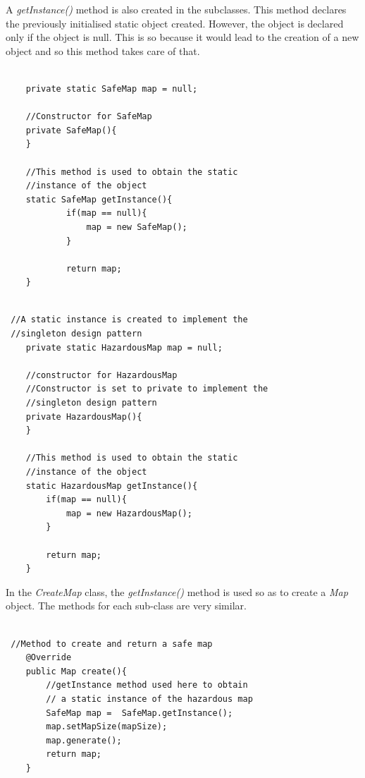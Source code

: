 \documentclass[a4paper,12pt]{extarticle}
\begin{document}
\noindent A \textit{getInstance()} method is also created in the subclasses. This method declares the previously initialised static object created. However, the object is declared only if the object is null. This is so because it would lead to the creation of a new object and so this method takes care of that.\\

\newpage
\begin{lstlisting}

    private static SafeMap map = null;

    //Constructor for SafeMap
    private SafeMap(){
    }

    //This method is used to obtain the static 
    //instance of the object
    static SafeMap getInstance(){
            if(map == null){
                map = new SafeMap();
            }

            return map;
    }
    
\end{lstlisting}
\vspace{4mm}


\begin{lstlisting}
 //A static instance is created to implement the 
 //singleton design pattern
    private static HazardousMap map = null;

    //constructor for HazardousMap
    //Constructor is set to private to implement the 
    //singleton design pattern
    private HazardousMap(){
    }

    //This method is used to obtain the static 
    //instance of the object
    static HazardousMap getInstance(){
        if(map == null){
            map = new HazardousMap();
        }

        return map;
    }

\end{lstlisting}
\vspace{4mm}

\noindent In the \textit{CreateMap} class, the \textit{getInstance()} method is used so as to create a \textit{Map} object. The methods for each sub-class are very similar.

\newpage
\begin{lstlisting}

 //Method to create and return a safe map
    @Override
    public Map create(){
        //getInstance method used here to obtain
        // a static instance of the hazardous map
        SafeMap map =  SafeMap.getInstance();
        map.setMapSize(mapSize);
        map.generate();
        return map;
    }


\end{lstlisting}
\vspace{4mm}
\end{document}
